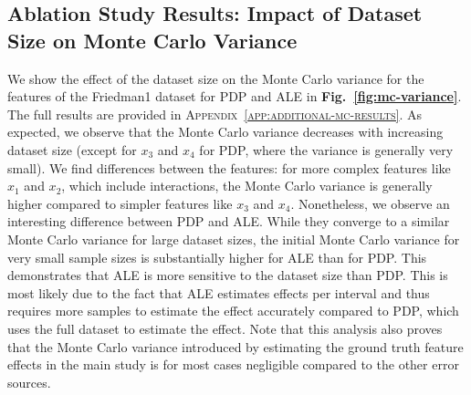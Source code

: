 \documentclass[runningheads]{llncs}
\begin{document}
\subsection{Ablation Study Results: Impact of Dataset Size on Monte Carlo Variance}\label{sec:results-dataset-size}

We show the effect of the dataset size on the Monte Carlo variance for the
features of the Friedman1 dataset for PDP and ALE in
\textbf{Fig.\@~\ref{fig:mc-variance}}. The full results are provided in
\textsc{Appendix~\ref{app:additional-mc-results}}. As expected, we observe that
the Monte Carlo variance decreases with increasing dataset size (except for
$x_3$ and $x_4$ for PDP, where the variance is generally very small). We
find differences between the features: for more complex features like $x_1$ and
$x_2$, which include interactions, the Monte Carlo variance is generally higher
compared to simpler features like $x_3$ and $x_4$. Nonetheless, we observe an
interesting difference between PDP and ALE. While they converge to a similar  %
Monte Carlo variance for large dataset sizes, the initial Monte Carlo variance
for very small sample sizes is substantially higher for ALE than for PDP. This  %
demonstrates that ALE is more sensitive to the dataset size than PDP. This is  %
most likely due to the fact that ALE estimates effects per interval and thus
requires more samples to estimate the effect accurately compared to PDP, which
uses the full dataset to estimate the effect. Note that this analysis
also proves that the Monte Carlo variance introduced by estimating the ground truth
feature effects in the main study is for most cases negligible compared to the
other error sources.
\end{document}

